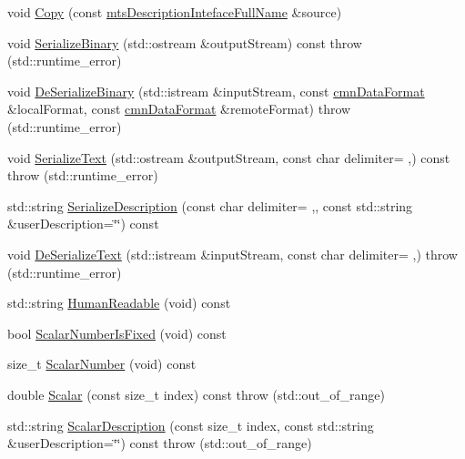 \begin{DoxyCompactItemize}
\item 
void \hyperlink{classmts_description_inteface_full_name_acfb4f72aa2669df862ef62e48952bb31}{Copy} (const \hyperlink{classmts_description_inteface_full_name}{mts\+Description\+Inteface\+Full\+Name} \&source)
\item 
void \hyperlink{classmts_description_inteface_full_name_a569b18643eef587c690ddcb453fc53bd}{Serialize\+Binary} (std\+::ostream \&output\+Stream) const   throw (std\+::runtime\+\_\+error)
\item 
void \hyperlink{classmts_description_inteface_full_name_a3281a4a51929da129237e2d3378c9e2a}{De\+Serialize\+Binary} (std\+::istream \&input\+Stream, const \hyperlink{classcmn_data_format}{cmn\+Data\+Format} \&local\+Format, const \hyperlink{classcmn_data_format}{cmn\+Data\+Format} \&remote\+Format)  throw (std\+::runtime\+\_\+error)
\item 
void \hyperlink{classmts_description_inteface_full_name_afa4ff9facf2402c9f272723c094c71d5}{Serialize\+Text} (std\+::ostream \&output\+Stream, const char delimiter= \textquotesingle{},\textquotesingle{}) const   throw (std\+::runtime\+\_\+error)
\item 
std\+::string \hyperlink{classmts_description_inteface_full_name_aeccacf1652d6b76c91855c5a55d8324e}{Serialize\+Description} (const char delimiter= \textquotesingle{},\textquotesingle{}, const std\+::string \&user\+Description=\char`\"{}\char`\"{}) const 
\item 
void \hyperlink{classmts_description_inteface_full_name_ac8f0f22b44c061ac00b3c37345b1264c}{De\+Serialize\+Text} (std\+::istream \&input\+Stream, const char delimiter= \textquotesingle{},\textquotesingle{})  throw (std\+::runtime\+\_\+error)
\item 
std\+::string \hyperlink{classmts_description_inteface_full_name_a3af4d088b7dc68d64708384ec68a68af}{Human\+Readable} (void) const 
\item 
bool \hyperlink{classmts_description_inteface_full_name_a8b54a18f39b8b61c8b94e1256cc4de01}{Scalar\+Number\+Is\+Fixed} (void) const 
\item 
size\+\_\+t \hyperlink{classmts_description_inteface_full_name_aedad99d3a68de542986916e3d4f26cdd}{Scalar\+Number} (void) const 
\item 
double \hyperlink{classmts_description_inteface_full_name_a9d72e1b4ee6f1c1ae572a288b876fa46}{Scalar} (const size\+\_\+t index) const   throw (std\+::out\+\_\+of\+\_\+range)
\item 
std\+::string \hyperlink{classmts_description_inteface_full_name_a57819a1fb8f9c5c84fcaab8fbe5d5acf}{Scalar\+Description} (const size\+\_\+t index, const std\+::string \&user\+Description=\char`\"{}\char`\"{}) const   throw (std\+::out\+\_\+of\+\_\+range)
\end{DoxyCompactItemize}
